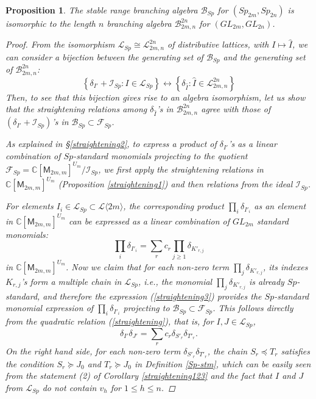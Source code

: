\documentclass[11pt]{amsart}
\numberwithin{equation}{subsection}
\newtheorem{proposition}[theorem]{Proposition}
\begin{document}
\begin{proposition}
The stable range branching algebra $\mathcal{B}_{{Sp}}$ for 
$({Sp}_{2m},{Sp}_{2n})$ is isomorphic to the length $n$ branching algebra 
$\mathcal{B}_{{2m,n}}^{2n}$ for $(GL_{2m}, GL_{2n})$.

\begin{proof}
From the isomorphism $\mathcal{L}_{Sp} \cong \mathcal{L}_{2m,n}^{2n}$ of distributive 
lattices, with $I \mapsto \hat{I}$, we can consider a bijection between the generating set
of $\mathcal{B}_{Sp}$ and the generating set of  $\mathcal{B}_{2m,n}^{2n}$:
$$\left\{ {\delta}_{I'} + \mathcal{I}_{Sp}: I\in \mathcal{L}_{Sp}\right\} 
\longleftrightarrow  \left\{ \delta_{\hat{I}} : \hat{I} \in \mathcal{L}_{2m,n}^{2n}\right\}$$ 
Then, to see that this bijection gives rise to an algebra isomorphism, let us show
that the straightening relations among $\delta_{\hat{I}}$'s in $\mathcal{B}_{2m,n}^{2n}$
agree with those of $({\delta}_{I'} + \mathcal{I}_{Sp})$'s in $\mathcal{B}_{{Sp}} 
\subset \mathcal{F}_{Sp}$.

As explained in \S \ref{straightening2}, to express a product of ${\delta}_{I'}$'s 
as a linear combination of $Sp$-standard monomials projecting to the quotient 
$\mathcal{F}_{Sp}=\mathbb{C}[\mathsf{M}_{2m,m}]^{U_m} / \mathcal{I}_{Sp}$, 
we first apply the straightening relations in $\mathbb{C}[\mathsf{M}_{2m,m}]^{U_m}$ 
(Proposition \ref{straightening1}) and then relations from 
the ideal $\mathcal{I}_{Sp}$. 


For elements $I_i \in \mathcal{L}_{Sp} \subset \mathcal{L}\langle 2m \rangle$, 
the corresponding product $\prod_i {\delta} _{I'_i}$ 
as an element in  $\mathbb{C}[\mathsf{M}_{2m,m}]^{U_m}$ can be 
expressed as a linear combination of $GL_{2m}$ standard monomials:
\begin{equation}\label{straightening3}
\prod_i {{\delta}} _{I'_i}=\sum_{r} c_{r} \prod_{j \geq 1} {{\delta}} _{K'_{r,j}}
\end{equation}
in  $\mathbb{C}[\mathsf{M}_{2m,m}]^{U_m}$. Now we claim that for each non-zero term
$\prod_j {\delta} _{K'_{r,j}}$, its indexes $K_{r,j}$'s form a multiple chain 
in $\mathcal{L}_{Sp}$, i.e., the monomial $\prod_j {\delta} _{K'_{r,j}}$ is already $Sp$-standard, 
and therefore the expression (\ref{straightening3}) provides the $Sp$-standard monomial expression 
of $\prod_i {\delta} _{I'_i}$ projecting to $\mathcal{B}_{{Sp}} \subset \mathcal{F}_{Sp}$.
This follows directly from the quadratic relation  (\ref{straightening}), that is,
for $I,J \in \mathcal{L}_{Sp}$,
$${{\delta}} _{I'} {{\delta}} _{J'}=\sum_{r}c_{r} {{\delta}} _{S'_{r}} {{\delta}} _{T'_{r}}.$$
On the right hand side, for each non-zero term ${\delta}_{S'_r} {\delta}_{T'_r}$, 
the chain $S_r \preceq T_r$ satisfies the condition $S_r \succeq J_0$ and $T_r \succeq J_0$ 
in Definition \ref{Sp-stm}, which can be easily seen from the statement (2) of Corollary 
\ref{straightening123} and the fact that $I$ and $J$ from $\mathcal{L}_{Sp}$ do not contain 
$v_h$ for $1 \leq h \leq n$.


\end{proof}
\end{proposition}
\end{document}
